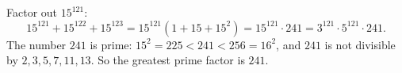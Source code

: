 Factor out $15^{121}$:
\[
15^{121}+15^{122}+15^{123}=15^{121}\left(1+15+15^2\right)=15^{121}\cdot241=3^{121}\cdot5^{121}\cdot241 .
\]
The number $241$ is prime: $15^2=225<241<256=16^2$, and $241$ is not divisible by $2,3,5,7,11,13$. So the greatest prime factor is $\boxed{241}$.
